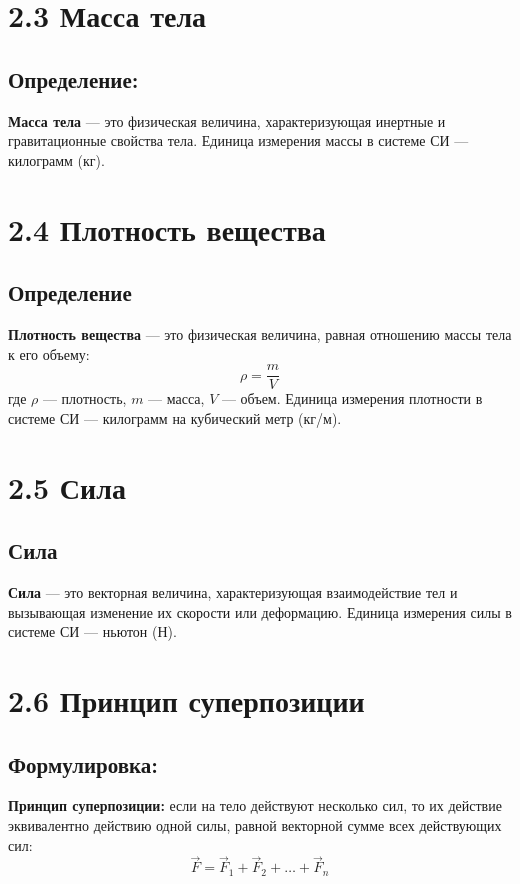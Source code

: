 \documentclass[a4paper, 12pt]{article}
\begin{document}
\section*{2.3 Масса тела}

\vspace{-9pt}
\subsection*{Определение:}
\vspace{-3pt}
\textbf{Масса тела} --- это физическая величина, характеризующая инертные и гравитационные свойства тела. Единица измерения массы в системе СИ --- килограмм (кг).


\section*{2.4 Плотность вещества}

\vspace{-9pt}
\subsection*{Определение}
\vspace{-3pt}
\textbf{Плотность вещества} --- это физическая величина, равная отношению массы тела к его объему:
$$ \rho = \frac{m}{V} $$
где $\rho $ --- плотность, $m $ --- масса, $V $ --- объем. Единица измерения плотности в системе СИ --- килограмм на кубический метр (кг/м$ $).


\section*{2.5 Сила}

\vspace{-9pt}
\subsection*{Сила}
\vspace{-3pt}
\textbf{Сила} --- это векторная величина, характеризующая взаимодействие тел и вызывающая изменение их скорости или деформацию. Единица измерения силы в системе СИ --- ньютон (Н).


\section*{2.6 Принцип суперпозиции}

\vspace{-9pt}
\subsection*{Формулировка:}
\vspace{-3pt}
\textbf{Принцип суперпозиции:} если на тело действуют несколько сил, то их действие эквивалентно действию одной силы, равной векторной сумме всех действующих сил:
$$ \vec{F} = \vec{F}_1 + \vec{F}_2 + \dots + \vec{F}_n $$
\end{document}
